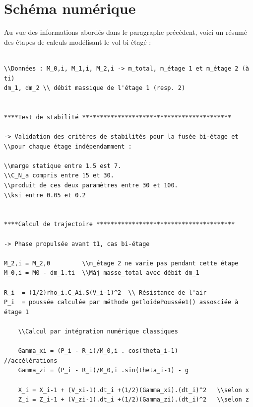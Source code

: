 \documentclass[a4paper]{article}
\begin{document}
\newpage 

\section{Schéma numérique}

Au vue des informations abordés dans le paragraphe précédent, voici un résumé des étapes de calculs modélisant le vol bi-étagé :

\begin{verbatim}

\\Données : M_0,i, M_1,i, M_2,i -> m_total, m_étage 1 et m_étage 2 (à ti)
dm_1, dm_2 \\ débit massique de l'étage 1 (resp. 2)


****Test de stabilité ******************************************

-> Validation des critères de stabilités pour la fusée bi-étage et
\\pour chaque étage indépendamment :

\\marge statique entre 1.5 est 7.
\\C_N_a compris entre 15 et 30.
\\produit de ces deux paramètres entre 30 et 100.
\\ksi entre 0.05 et 0.2


****Calcul de trajectoire ***************************************

-> Phase propulsée avant t1, cas bi-étage

M_2,i = M_2,0		  \\m_étage 2 ne varie pas pendant cette étape	
M_0,i = M0 - dm_1.ti  \\Màj masse_total avec débit dm_1

R_i  = (1/2)rho_i.C_Ai.S(V_i-1)^2  \\ Résistance de l'air
P_i  = poussée calculée par méthode getloidePoussée1() assosciée à étage 1

	\\Calcul par intégration numérique classiques

	Gamma_xi = (P_i - R_i)/M_0,i . cos(theta_i-1)		//accélérations
	Gamma_zi = (P_i - R_i)/M_0,i .sin(theta_i-1) - g

	X_i = X_i-1 + (V_xi-1).dt_i +(1/2)(Gamma_xi).(dt_i)^2	\\selon x
	Z_i = Z_i-1 + (V_zi-1).dt_i +(1/2)(Gamma_zi).(dt_i)^2	\\selon z


\end{verbatim}
\end{document}
